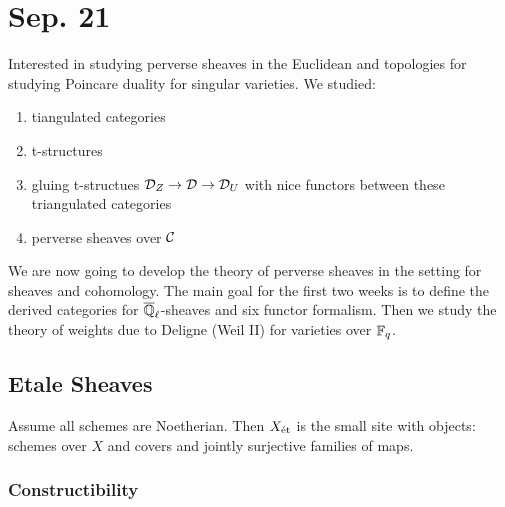 \documentclass[12pt]{article}
\begin{document}
\section{Sep. 21}

Interested in studying perverse sheaves in the Euclidean and \etale topologies for studying Poincare duality for singular varieties. We studied:
\begin{enumerate}
\item tiangulated categories
\item t-structures
\item gluing t-structues $\mathcal{D}_Z \to \mathcal{D} \to \mathcal{D}_U$ with nice functors between these triangulated categories
\item perverse sheaves over $\mathcal{C}$
\end{enumerate}
\noindent
We are now going to develop the theory of perverse sheaves in the \etale setting for \etale sheaves and \etale cohomology. The main goal for the first two weeks is to define the derived categories for $\overline{\mathbb{Q}}_\ell$-sheaves and six functor formalism. Then we study the theory of weights due to Deligne (Weil II) for varieties over $\mathbb{F}_q$.

\subsection{Etale Sheaves}

Assume all schemes are Noetherian. Then $X_{\text{\'{e}t}}$ is the small \etale site with objects: schemes \etale over $X$ and covers and jointly surjective families of \etale maps. 

\subsubsection{Constructibility}
\end{document}
